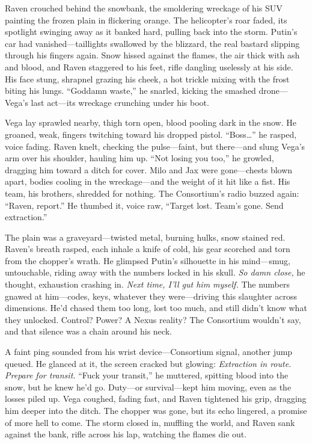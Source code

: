\documentclass[12pt]{book}
\begin{document}
Raven crouched behind the snowbank, the smoldering wreckage of his SUV painting the frozen plain in flickering orange. The helicopter’s roar faded, its spotlight swinging away as it banked hard, pulling back into the storm. Putin’s car had vanished—taillights swallowed by the blizzard, the real bastard slipping through his fingers again. Snow hissed against the flames, the air thick with ash and blood, and Raven staggered to his feet, rifle dangling uselessly at his side. His face stung, shrapnel grazing his cheek, a hot trickle mixing with the frost biting his lungs. “Goddamn waste,” he snarled, kicking the smashed drone—Vega’s last act—its wreckage crunching under his boot.

Vega lay sprawled nearby, thigh torn open, blood pooling dark in the snow. He groaned, weak, fingers twitching toward his dropped pistol. “Boss…” he rasped, voice fading. Raven knelt, checking the pulse—faint, but there—and slung Vega’s arm over his shoulder, hauling him up. “Not losing you too,” he growled, dragging him toward a ditch for cover. Milo and Jax were gone—chests blown apart, bodies cooling in the wreckage—and the weight of it hit like a fist. His team, his brothers, shredded for nothing. The Consortium’s radio buzzed again: “Raven, report.” He thumbed it, voice raw, “Target lost. Team’s gone. Send extraction.”

The plain was a graveyard—twisted metal, burning hulks, snow stained red. Raven’s breath rasped, each inhale a knife of cold, his gear scorched and torn from the chopper’s wrath. He glimpsed Putin’s silhouette in his mind—smug, untouchable, riding away with the numbers locked in his skull. \textit{So damn close,} he thought, exhaustion crashing in. \textit{Next time, I’ll gut him myself.} The numbers gnawed at him—codes, keys, whatever they were—driving this slaughter across dimensions. He’d chased them too long, lost too much, and still didn’t know what they unlocked. Control? Power? A Nexus reality? The Consortium wouldn’t say, and that silence was a chain around his neck.

A faint ping sounded from his wrist device—Consortium signal, another jump queued. He glanced at it, the screen cracked but glowing: \textit{Extraction in route. Prepare for transit.} “Fuck your transit,” he muttered, spitting blood into the snow, but he knew he’d go. Duty—or survival—kept him moving, even as the losses piled up. Vega coughed, fading fast, and Raven tightened his grip, dragging him deeper into the ditch. The chopper was gone, but its echo lingered, a promise of more hell to come. The storm closed in, muffling the world, and Raven sank against the bank, rifle across his lap, watching the flames die out.
\end{document}
